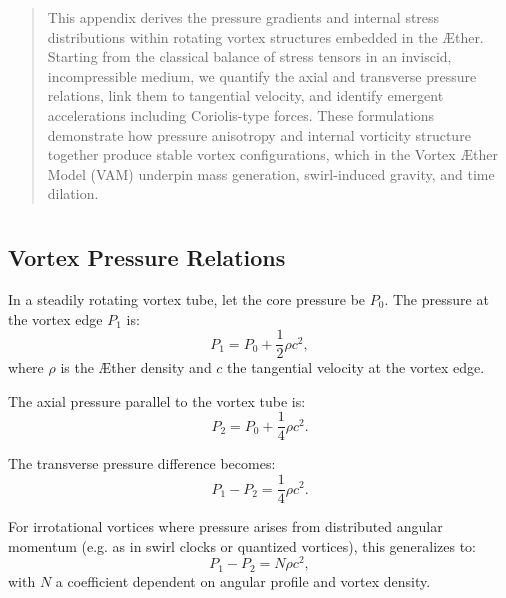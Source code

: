 \documentclass[12pt]{article}
\begin{document}
    \titlepageOpen

    \begin{abstract}
        This appendix derives the pressure gradients and internal stress distributions within rotating vortex structures embedded in the Æther. Starting from the classical balance of stress tensors in an inviscid, incompressible medium, we quantify the axial and transverse pressure relations, link them to tangential velocity, and identify emergent accelerations including Coriolis-type forces. These formulations demonstrate how pressure anisotropy and internal vorticity structure together produce stable vortex configurations, which in the Vortex Æther Model (VAM) underpin mass generation, swirl-induced gravity, and time dilation.
    \end{abstract}


    \titlepageClose
    \fi

    \section{\papertitle}


    \subsection{Vortex Pressure Relations}
    In a steadily rotating vortex tube, let the core pressure be \(P_0\). The pressure at the vortex edge \(P_1\) is:
    \begin{equation}
        P_1 = P_0 + \frac{1}{2} \rho c^2,
    \end{equation}
    where \(\rho\) is the Æther density and \(c\) the tangential velocity at the vortex edge.

    The axial pressure parallel to the vortex tube is:
    \begin{equation}
        P_2 = P_0 + \frac{1}{4} \rho c^2.
    \end{equation}

    The transverse pressure difference becomes:
    \begin{equation}
        P_1 - P_2 = \frac{1}{4} \rho c^2.
    \end{equation}

    For irrotational vortices where pressure arises from distributed angular momentum (e.g. as in swirl clocks or quantized vortices), this generalizes to:
    \begin{equation}
        P_1 - P_2 = N \rho c^2,
    \end{equation}
    with \(N\) a coefficient dependent on angular profile and vortex density.
\end{document}
